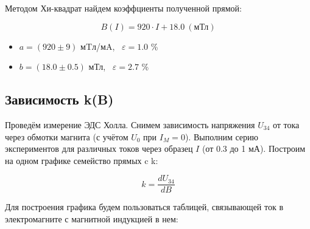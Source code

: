 Методом Хи-квадрат найдем коэффциенты полученной прямой:

$$
    B(I) = 920 \cdot I + 18.0 \ (\text{мТл})
$$

\begin{itemize}
    \item $a = \left( 920\pm 9 \right)$ мTл/мA, \ $\varepsilon = 1.0$ \% 
    \item $b = \left( 18.0\pm 0.5 \right)$ мТл, \ $\varepsilon = 2.7$ \% 
\end{itemize}


\subsection{Зависимость k(B)}
Проведём измерение ЭДС Холла. Снимем зависимость напряжения $U_{34}$ от тока через обмотки магнита (с учётом $U_0$ при $I_M = 0$). Выполним серию экспериментов для различных токов через образец $I$ (от 0.3 до 1 мА). Построим на одном графике семейство прямых c k:
    
$$
   k = \frac{dU_{34}}{dB}
$$

Для построения графика будем пользоваться таблицей, связывающей ток в электромагните с магнитной индукцией в нем:

